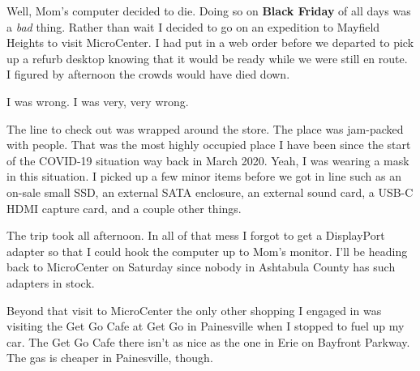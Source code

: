 Well, Mom's computer decided to die. Doing so on \textbf{Black Friday}
of all days was a \emph{bad} thing. Rather than wait I decided to go on
an expedition to Mayfield Heights to visit MicroCenter. I had put in a
web order before we departed to pick up a refurb desktop knowing that it
would be ready while we were still en route. I figured by afternoon the
crowds would have died down.

I was wrong. I was very, very wrong.

The line to check out was wrapped around the store. The place was
jam-packed with people. That was the most highly occupied place I have
been since the start of the COVID-19 situation way back in March 2020.
Yeah, I was wearing a mask in this situation. I picked up a few minor
items before we got in line such as an on-sale small SSD, an external
SATA enclosure, an external sound card, a USB-C HDMI capture card, and a
couple other things.

The trip took all afternoon. In all of that mess I forgot to get a
DisplayPort adapter so that I could hook the computer up to Mom's
monitor. I'll be heading back to MicroCenter on Saturday since nobody in
Ashtabula County has such adapters in stock.

Beyond that visit to MicroCenter the only other shopping I engaged in
was visiting the Get Go Cafe at Get Go in Painesville when I stopped to
fuel up my car. The Get Go Cafe there isn't as nice as the one in Erie
on Bayfront Parkway. The gas is cheaper in Painesville, though.

